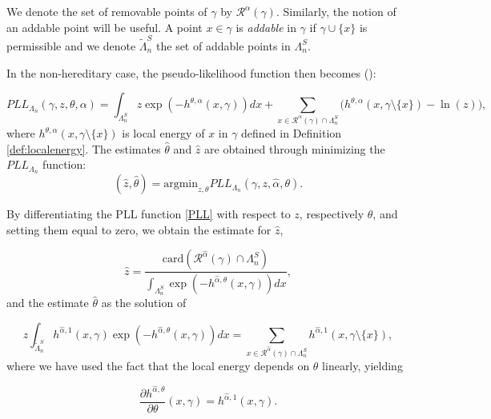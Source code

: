 We denote the set of removable points of $\gamma$ by $\mathcal R^\alpha(\gamma)$. Similarly, the notion of an addable point will be useful. A point $x\in\gamma$ is \textit{addable} in $\gamma$ if $\gamma \cup \{x\}$ is permissible and we denote $\tilde\Lambda^S_n$ the set of addable points in $\Lambda^S_n$. 

In the non-hereditary case, the pseudo-likelihood function then becomes (\cite{DereudreLavancier2011}):

\begin{equation}\label{PLL}
	PLL_{\Lambda_n}(\gamma,z,\theta, \alpha) = \int_{\Lambda^S_n} z \exp (-h^{\theta,\alpha}(x,\gamma)) dx + \sum_{x\in\mathcal R^\alpha(\gamma)\cap \Lambda^S_n} \big(h^{\theta,\alpha}(x,\gamma\setminus\{x\}) - \ln(z)\big),
\end{equation}
where $h^{\theta,\alpha}(x, \gamma \setminus \{x\})$ is local energy of $x$ in $\gamma$ defined in Definition \ref{def:localenergy}. 
The estimates $\hat\theta$ and $\hat z$ are obtained through minimizing the $PLL_{\Lambda_n}$ function:
$$(\hat z, \hat\theta) = \text{argmin}_{z,\theta} PLL_{\Lambda_n} (\gamma, z, \hat\alpha,\theta).$$

By  differentiating the PLL function \eqref{PLL} with respect to $z$, respectively $\theta$, and setting them equal to zero, we obtain the estimate for $\hat z$,

\begin{equation}\label{z_hat}
	\hat z = \frac{\mbox{card}(\mathcal R^{\hat\alpha}(\gamma)\cap \Lambda^S_n)}{\int_{\Lambda^S_n} \exp{\left( -h^{\hat\alpha,\theta}(x,\gamma)\right)} dx},
\end{equation}
and the estimate $\hat\theta$ as the solution of

\begin{equation}\label{theta_hat} 
	z \int_{\tilde\Lambda^S_n}  h^{\hat\alpha,1}(x,\gamma)\exp{\left(-h^{\hat\alpha,\theta}(x,\gamma)\right)} dx = \sum_{x \in \mathcal R^{\hat\alpha}(\gamma)\cap \Lambda^S_n} h^{\hat\alpha,1}(x,\gamma\setminus\{x\}),
\end{equation}
where we have used the fact that the local energy depends on $\theta$ linearly, yielding

$$\frac{\partial h^{\hat\alpha,\theta}}{\partial \theta} (x,\gamma) = h^{\hat\alpha,1}(x,\gamma).$$

